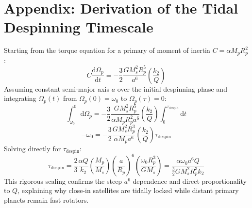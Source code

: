 \documentclass[11pt,a4paper]{article}
\begin{document}
\appendix
\section*{Appendix: Derivation of the Tidal Despinning Timescale}
Starting from the torque equation for a primary of moment of inertia $C = \alpha M_p R_p^2$:
\begin{equation}
C \frac{\mathrm{d}\Omega_p}{\mathrm{d}t} = - \frac{3}{2} \frac{G M_s^2 R_p^5}{a^6} \left(\frac{k_2}{Q}\right)
\end{equation}
Assuming constant semi-major axis $a$ over the initial despinning phase and integrating $\Omega_p(t)$ from $\Omega_p(0) = \omega_0$ to $\Omega_p(\tau) = 0$:
\begin{equation}
\int_{\omega_0}^0 \mathrm{d}\Omega_p = -\frac{3}{2} \frac{G M_s^2 R_p^5}{\alpha M_p R_p^2 a^6} \left(\frac{k_2}{Q}\right) \int_0^{\tau_{\text{despin}}} \mathrm{d}t
\end{equation}
\begin{equation}
-\omega_0 = -\frac{3}{2} \frac{G M_s^2 R_p^3}{\alpha M_p a^6} \left(\frac{k_2}{Q}\right) \tau_{\text{despin}}
\end{equation}
Solving directly for $\tau_{\text{despin}}$:
\begin{equation}
\tau_{\text{despin}} = \frac{2}{3} \frac{\alpha Q}{k_2} \left(\frac{M_p}{M_s}\right) \left(\frac{a}{R_p}\right)^6 \left(\frac{\omega_0 R_p^3}{G M_s}\right) = \frac{\alpha \omega_0 a^6 Q}{\frac{3}{2} G M_s^2 R_p^3 k_2}
\end{equation}
This rigorous scaling confirms the steep $a^6$ dependence and direct proportionality to $Q$, explaining why close-in satellites are tidally locked while distant primary planets remain fast rotators.
\end{document}
